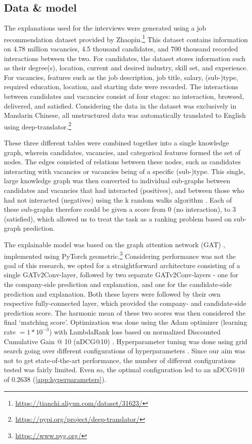 \subsection{Data \& model}
The explanations used for the interviews were generated using a job recommendation dataset provided by Zhaopin.\footnote{\url{https://tianchi.aliyun.com/dataset/31623/}} This dataset contains information on 4.78 million vacancies, 4.5 thousand candidates, and 700 thousand recorded interactions between the two. For candidates, the dataset stores information such as their degree(s), location, current and desired industry, skill set, and experience. For vacancies, features such as the job description, job title, salary, (sub-)type, required education, location, and starting date were recorded. The interactions between candidates and vacancies consist of four stages: no interaction, browsed, delivered, and satisfied. Considering the data in the dataset was exclusively in Mandarin Chinese, all unstructured data was automatically translated to English using deep-translator.\footnote{\url{https://pypi.org/project/deep-translator/}}

These three different tables were combined together into a single knowledge graph, wherein candidates, vacancies, and categorical features formed the set of nodes. The edges consisted of relations between these nodes, such as candidates interacting with vacancies or vacancies being of a specific (sub-)type. This single, large knowledge graph was then converted to individual sub-graphs between candidates and vacancies that had interacted (positives), and between those who had not interacted (negatives) using the k random walks algorithm \cite{lovasz1993random}. Each of these sub-graphs therefore could be given a score from 0 (no interaction), to 3 (satisfied), which allowed us to treat the task as a ranking problem based on sub-graph prediction.

The explainable model was based on the graph attention network (GAT) \cite{velivckovic2017graph}, implemented using PyTorch geometric.\footnote{\url{https://www.pyg.org/}} Considering performance was not the goal of this research, we opted for a straightforward architecture consisting of a single GATv2Conv-layer, followed by two separate GATv2Conv-layers - one for the company-side prediction and explanation, and one for the candidate-side prediction and explanation. Both these layers were followed by their own respective fully-connected layer, which provided the company- and candidate-side prediction score. The harmonic mean of these two scores was then considered the final `matching score'. Optimization was done using the Adam optimizer \cite{kingma2014adam} (learning rate $= 1 * 10^{-3}$) with LambdaRank loss based on normalized Discounted Cumulative Gain @ 10 (nDCG@10) \cite{burges2006learning}. Hyperparameter tuning was done using grid search going over different configurations of hyperparameters \cite{liashchynskyi2019grid}. Since our aim was not to get state-of-the-art performance, the number of different configurations tested was fairly limited. Even so, the optimal configuration led to an nDCG@10 of 0.2638 (\cref{app:hyperparameters}).

